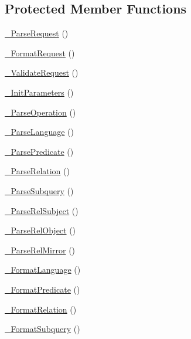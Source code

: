 \subsection*{Protected Member Functions}
\begin{DoxyCompactItemize}
\item 
\hyperlink{class_c_ontology_wrapper_a744158c5f34f6b609332386e7fa3dcc0}{\-\_\-\-Parse\-Request} ()
\item 
\hyperlink{class_c_ontology_wrapper_a3c8d6b45c1a7439863c7a7c624685fe6}{\-\_\-\-Format\-Request} ()
\item 
\hyperlink{class_c_ontology_wrapper_a1804be7ffd6f2c76911757e248721ed0}{\-\_\-\-Validate\-Request} ()
\item 
\hyperlink{class_c_ontology_wrapper_a6a0b9b8f007455703af1f13901d07e6a}{\-\_\-\-Init\-Parameters} ()
\item 
\hyperlink{class_c_ontology_wrapper_aafcb67362b104e456f5021f5ac8d953c}{\-\_\-\-Parse\-Operation} ()
\item 
\hyperlink{class_c_ontology_wrapper_acd547aac2e68a0af8087205ac3936f96}{\-\_\-\-Parse\-Language} ()
\item 
\hyperlink{class_c_ontology_wrapper_ac7d6e87ccce8614f023b517944afe2e1}{\-\_\-\-Parse\-Predicate} ()
\item 
\hyperlink{class_c_ontology_wrapper_a7a42ec2eec0c2a3e541ee9f01c8ffc1d}{\-\_\-\-Parse\-Relation} ()
\item 
\hyperlink{class_c_ontology_wrapper_af15ee180d487325af0bb45a21fd559e8}{\-\_\-\-Parse\-Subquery} ()
\item 
\hyperlink{class_c_ontology_wrapper_adb70ad81542bd5fa3a9d3e99bb1226ae}{\-\_\-\-Parse\-Rel\-Subject} ()
\item 
\hyperlink{class_c_ontology_wrapper_a2318ee98558d1821d04617a51761ff57}{\-\_\-\-Parse\-Rel\-Object} ()
\item 
\hyperlink{class_c_ontology_wrapper_ac44f7108d423e9b9a846a8505f0ea4ad}{\-\_\-\-Parse\-Rel\-Mirror} ()
\item 
\hyperlink{class_c_ontology_wrapper_a9eb4cc1d7cad579780d9992d1b63e722}{\-\_\-\-Format\-Language} ()
\item 
\hyperlink{class_c_ontology_wrapper_a3dbe14a223ba9573de23a39cdffc78ce}{\-\_\-\-Format\-Predicate} ()
\item 
\hyperlink{class_c_ontology_wrapper_a075931ffaafe656e8829c14f6f8c53e8}{\-\_\-\-Format\-Relation} ()
\item 
\hyperlink{class_c_ontology_wrapper_a9391d5006fda356996db159f4e7ae729}{\-\_\-\-Format\-Subquery} ()

\end{DoxyCompactItemize}
